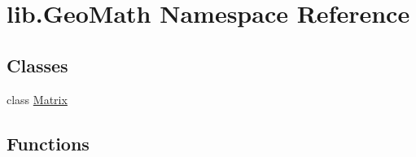 \hypertarget{namespacelib_1_1_geo_math}{\section{lib.\-Geo\-Math Namespace Reference}
\label{namespacelib_1_1_geo_math}
}
\subsection*{Classes}
\begin{DoxyCompactItemize}
\item 
class \hyperlink{classlib_1_1_geo_math_1_1_matrix}{Matrix}
\end{DoxyCompactItemize}
\subsection*{Functions}
